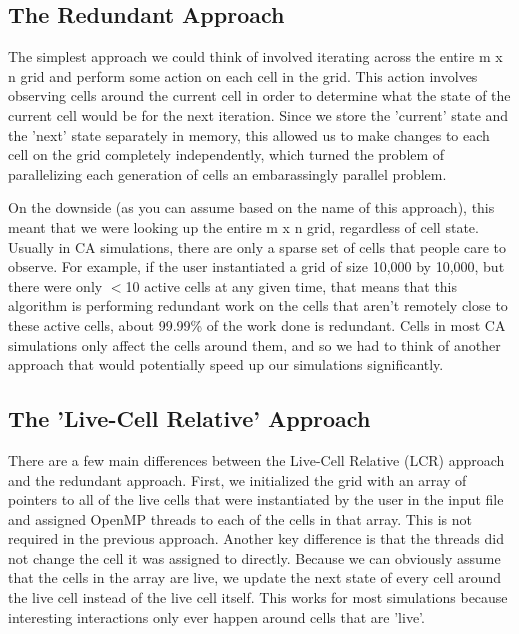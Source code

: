 \documentclass[12pt]{article}
\begin{document}
\subsection{The Redundant Approach}
The simplest approach we could think of involved iterating across the entire m x n grid and perform some action on each cell in the grid. This action involves observing cells around the current cell in order to determine what the state of the current cell would be for the next iteration. Since we store the 'current' state and the 'next' state separately in memory, this allowed us to make changes to each cell on the grid completely independently, which turned the problem of parallelizing each generation of cells an embarassingly parallel problem.

On the downside (as you can assume based on the name of this approach), this meant that we were looking up the entire m x n grid, regardless of cell state. Usually in CA simulations, there are only a sparse set of cells that people care to observe. For example, if the user instantiated a grid of size 10,000 by 10,000, but there were only $<$10 active cells at any given time, that means that this algorithm is performing redundant work on the cells that aren't remotely close to these active cells, about 99.99\% of the work done is redundant. Cells in most CA simulations only affect the cells around them, and so we had to think of another approach that would potentially speed up our simulations significantly.

\subsection{The 'Live-Cell Relative' Approach}
There are a few main differences between the Live-Cell Relative (LCR) approach and the redundant approach. First, we initialized the grid with an array of pointers to all of the live cells that were instantiated by the user in the input file and assigned OpenMP threads to each of the cells in that array. This is not required in the previous approach. Another key difference is that the threads did not change the cell it was assigned to directly. Because we can obviously assume that the cells in the array are live, we update the next state of every cell around the live cell instead of the live cell itself. This works for most simulations because interesting interactions only ever happen around cells that are 'live'.
\end{document}
